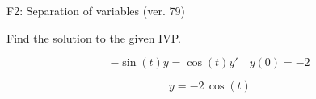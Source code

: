 \begin{exercise}
  \begin{exerciseTitle}F2: Separation of variables (ver. 79)\end{exerciseTitle}
  \begin{exerciseStatement}
    
Find the solution to the given IVP.

    
\[-\sin\left(t\right) y= \cos\left(t\right) y'\hspace{1em} y\left( 0 \right)= -2\]

  \end{exerciseStatement}
  \begin{exerciseAnswer}
    
\[y= -2 \, \cos\left(t\right)\]

  \end{exerciseAnswer}
\end{exercise}